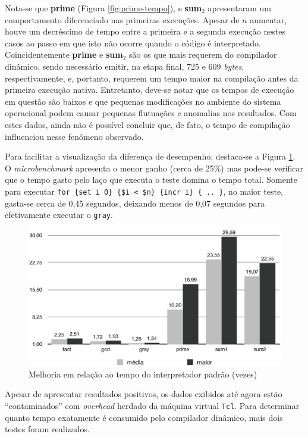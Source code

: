 Nota-se que \textbf{prime} (Figura \ref{fig:prime-tempo}),
e \textbf{sum$_2$} apresentaram um comportamento
diferenciado nas primeiras execuções. Apesar de $n$ aumentar,
houve um decréscimo de tempo entre a primeira e a segunda
execução nestes casos ao passo em que isto não ocorre quando o código é
interpretado.
Coincidentemente \textbf{prime} e \textbf{sum$_2$} são os que
mais requerem do compilador dinâmico, sendo necessário emitir, na
etapa final, 725 e 609
\textit{bytes}, respectivamente, e, portanto, requerem um tempo maior
na compilação antes da primeira execução nativa. Entretanto, deve-se
notar que os tempos de execução em questão são baixos e que pequenas
modificações no ambiente do sistema operacional podem causar pequenas
flutuações e anomalias nos resultados. Com estes dados, ainda não é
possível concluir que, de fato, o tempo de compilação influenciou
nesse fenômeno observado.

Para facilitar a visualização da diferença de desempenho,
destaca-se a Figura \ref{fig:media-tempo}. O \textit{microbenchmark}
apresenta o menor ganho (cerca de 25\%) mas pode-se verificar que o
tempo gasto pelo laço que
executa o teste domina o tempo total. Somente para executar
\verb!for {set i 0} {$i < $n} {incr i} { .. }!, no maior
teste, gasta-se cerca
de 0,45 segundos, deixando menos de 0,07 segundos para efetivamente
executar o \verb!gray!.

\begin{figure}[ht]
  \centering
  \includegraphics[scale=0.70]{figs/melhoria}
  \caption{Melhoria em relação ao tempo do interpretador padrão (vezes) \label{fig:media-tempo}}
\end{figure}

Apesar de apresentar resultados positivos, os dados exibidos até
agora estão ``contaminados'' com \textit{overhead} herdado da
máquina virtual \texttt{Tcl}. Para determinar quanto tempo exatamente
é consumido pelo compilador dinâmico, mais dois testes foram
realizados.

